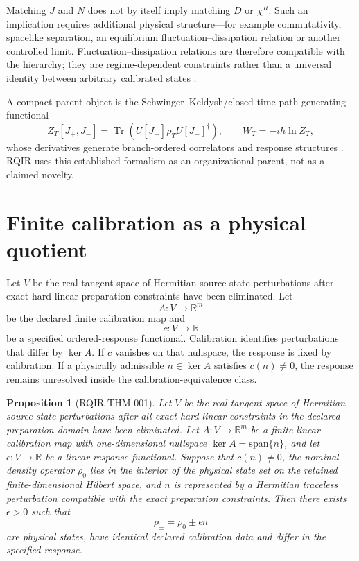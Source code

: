 \documentclass[12pt]{article}
\newtheorem{proposition}{Proposition}
\newcommand{\Tr}{\operatorname{Tr}}
\begin{document}
Matching $J$ and $N$ does not by itself imply matching $D$ or $\chi^R$. Such an implication requires additional physical structure---for example commutativity, spacelike separation, an equilibrium fluctuation--dissipation relation or another controlled limit. Fluctuation--dissipation relations are therefore compatible with the hierarchy; they are regime-dependent constraints rather than a universal identity between arbitrary calibrated states \cite{Kubo1957}.

A compact parent object is the Schwinger--Keldysh/closed-time-path generating functional
\begin{equation}
 Z_T[J_+,J_-]=\Tr\!\left(U[J_+]\rho_T U[J_-]^\dagger\right),
 \qquad W_T=-i\hbar\ln Z_T,
\end{equation}
whose derivatives generate branch-ordered correlators and response structures \cite{FeynmanVernon1963,Keldysh1965}. RQIR uses this established formalism as an organizational parent, not as a claimed novelty.

\section{Finite calibration as a physical quotient}

Let $V$ be the real tangent space of Hermitian source-state perturbations after exact hard linear preparation constraints have been eliminated. Let
\begin{equation}
 A:V\rightarrow\mathbb R^m
\end{equation}
be the declared finite calibration map and
\begin{equation}
 c:V\rightarrow\mathbb R
\end{equation}
be a specified ordered-response functional. Calibration identifies perturbations that differ by $\ker A$. If $c$ vanishes on that nullspace, the response is fixed by calibration. If a physically admissible $n\in\ker A$ satisfies $c(n)\neq0$, the response remains unresolved inside the calibration-equivalence class.

\begin{proposition}[RQIR-THM-001]
Let $V$ be the real tangent space of Hermitian source-state perturbations after all exact hard linear constraints in the declared preparation domain have been eliminated. Let $A:V\to\mathbb R^m$ be a finite linear calibration map with one-dimensional nullspace $\ker A=\mathrm{span}\{n\}$, and let $c:V\to\mathbb R$ be a linear response functional. Suppose that $c(n)\neq0$, the nominal density operator $\rho_0$ lies in the interior of the physical state set on the retained finite-dimensional Hilbert space, and $n$ is represented by a Hermitian traceless perturbation compatible with the exact preparation constraints. Then there exists $\epsilon>0$ such that
\begin{equation}
 \rho_\pm=\rho_0\pm\epsilon n
\end{equation}
are physical states, have identical declared calibration data and differ in the specified response.
\end{proposition}
\end{document}
